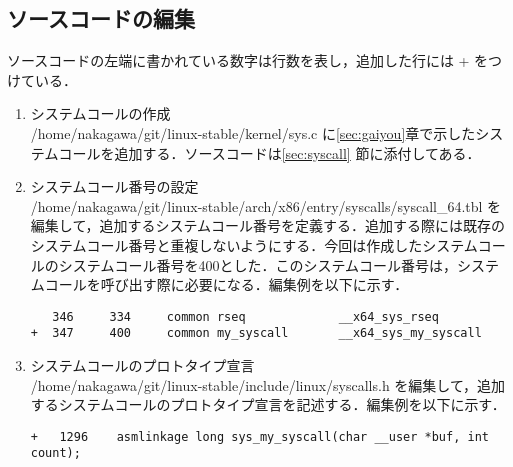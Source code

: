 \documentclass[12pt]{jsarticle}
\begin{document}
\subsection{ソースコードの編集}\label{sec:hensyuu}
ソースコードの左端に書かれている数字は行数を表し，追加した行には + をつけている．
  \begin{enumerate}
  \item システムコールの作成\\    
    /home/nakagawa/git/linux-stable/kernel/sys.c に\ref{sec:gaiyou}章で示したシステムコールを追加する．ソースコードは\ref{sec:syscall} 節に添付してある．
  \item システムコール番号の設定\\
    /home/nakagawa/git/linux-stable/arch/x86/entry/syscalls/syscall\_64.tbl を編集して，追加するシステムコール番号を定義する．追加する際には既存のシステムコール番号と重複しないようにする．今回は作成したシステムコールのシステムコール番号を400とした．このシステムコール番号は，システムコールを呼び出す際に必要になる．編集例を以下に示す．
    
\begin{verbatim}
   346     334     common rseq             __x64_sys_rseq
+  347     400     common my_syscall       __x64_sys_my_syscall
\end{verbatim}

\item システムコールのプロトタイプ宣言\\  
  /home/nakagawa/git/linux-stable/include/linux/syscalls.h を編集して，追加するシステムコールのプロトタイプ宣言を記述する．編集例を以下に示す．
\begin{verbatim}
+   1296    asmlinkage long sys_my_syscall(char __user *buf, int count);
\end{verbatim}
  \end{enumerate}
  
\end{document}
